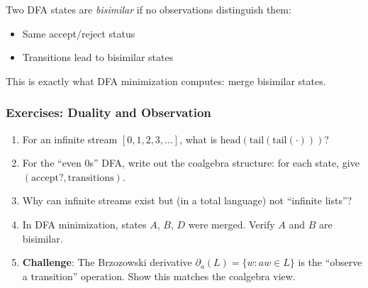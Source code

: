 \begin{goingdeeper}
Two DFA states are \emph{bisimilar} if no observations distinguish them:
\begin{itemize}
  \item Same accept/reject status
  \item Transitions lead to bisimilar states
\end{itemize}

This is exactly what DFA minimization computes: merge bisimilar states.

\subsubsection*{Exercises: Duality and Observation}

\begin{enumerate}
  \item For an infinite stream $[0, 1, 2, 3, \ldots]$, what is $\text{head}(\text{tail}(\text{tail}(\cdot)))$?

  \item For the ``even 0s'' DFA, write out the coalgebra structure: for each state, give $(\text{accept?}, \text{transitions})$.

  \item Why can infinite streams exist but (in a total language) not ``infinite lists''?

  \item In DFA minimization, states $A$, $B$, $D$ were merged. Verify $A$ and $B$ are bisimilar.

  \item \textbf{Challenge}: The Brzozowski derivative $\partial_a(L) = \{w : aw \in L\}$ is the ``observe a transition'' operation. Show this matches the coalgebra view.
\end{enumerate}
\end{goingdeeper}

